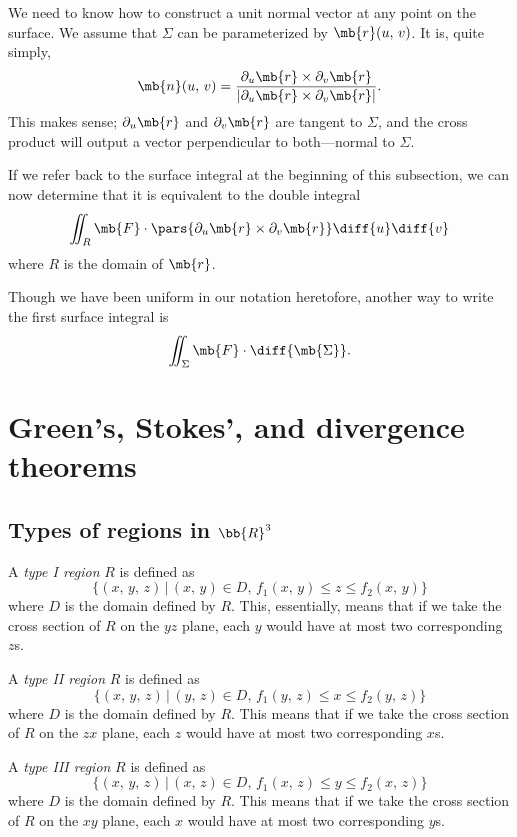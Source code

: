 \documentclass[11pt]{article}
\theoremstyle{definition}
\begin{document}
We need to know how to construct a unit normal vector at any point on the surface. We assume that $\Sigma$ can be parameterized by $\mb{r}(u,\, v)$. It is, quite simply,
$$
\mb{n}(u,\,v) = \frac{\partial_u\mb{r}\times\partial_v\mb{r}}{|\partial_u\mb{r}\times\partial_v\mb{r}|}.
$$
This makes sense; $\partial_u\mb{r}$ and $\partial_v\mb{r}$ are tangent to $\Sigma$, and the cross product will output a vector perpendicular to both---normal to $\Sigma$.


If we refer back to the surface integral at the beginning of this subsection, we can now determine that it is equivalent to the double integral
$$
\iint_R \mb{F} \cdot \pars{\partial_u\mb{r}\times\partial_v\mb{r}} \diff{u}\diff{v}
$$
where $R$ is the domain of $\mb{r}$.


Though we have been uniform in our notation heretofore, another way to write the first surface integral is
$$
\iint_\Sigma \mb{F} \cdot \diff{\mb{\Sigma}}.
$$ 



\section{Green's, Stokes', and divergence theorems}

\subsection{Types of regions in $\bb{R}^3$}
A \textit{type I region} $R$ is defined as
$$
 \{ (x,\,y,\,z) \, |\, (x,\,y) \in D,\, f_1(x,\, y) \leqslant z \leqslant f_2(x,\,y)\}
$$
where $D$ is the domain defined by $R$. This, essentially, means that if we take the cross section of $R$ on the $yz$ plane, each $y$ would have at most two corresponding $z$s. 


A \textit{type II region} $R$ is defined as 
$$
 \{ (x,\,y,\,z) \, |\, (y,\,z) \in D,\, f_1(y,\, z) \leqslant x \leqslant f_2(y,\, z)\}
$$
where $D$ is the domain defined by $R$. This means that if we take the cross section of $R$ on the $zx$ plane, each $z$ would have at most two corresponding $x$s.


A \textit{type III region} $R$ is defined as 
$$
 \{ (x,\,y,\,z) \, |\, (x,\,z) \in D,\, f_1(x,\, z) \leqslant y \leqslant f_2(x,\, z)\}
$$
where $D$ is the domain defined by $R$. This means that if we take the cross section of $R$ on the $xy$ plane, each $x$ would have at most two corresponding $y$s.
\end{document}
